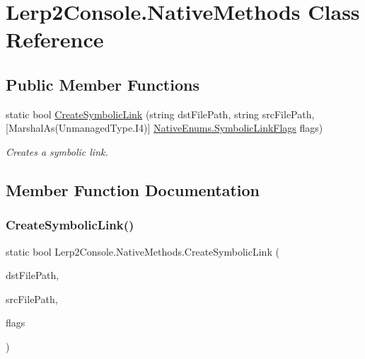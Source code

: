 \hypertarget{class_lerp2_console_1_1_native_methods}{}\section{Lerp2\+Console.\+Native\+Methods Class Reference}
\label{class_lerp2_console_1_1_native_methods}
\subsection*{Public Member Functions}
\begin{DoxyCompactItemize}
\item 
static bool \hyperlink{class_lerp2_console_1_1_native_methods_a66b966f8621e0c2a7237ccb8d6f463ca}{Create\+Symbolic\+Link} (string dst\+File\+Path, string src\+File\+Path, \mbox{[}Marshal\+As(Unmanaged\+Type.\+I4)\mbox{]} \hyperlink{class_lerp2_console_1_1_native_enums_a4eb3b3db1c6666b1e520bd67a14d9727}{Native\+Enums.\+Symbolic\+Link\+Flags} flags)
\begin{DoxyCompactList}\small\item\em Creates a symbolic link. \end{DoxyCompactList}\end{DoxyCompactItemize}


\subsection{Member Function Documentation}
\mbox{\label{class_lerp2_console_1_1_native_methods_a66b966f8621e0c2a7237ccb8d6f463ca}} 
\subsubsection{\texorpdfstring{Create\+Symbolic\+Link()}{CreateSymbolicLink()}}
{\footnotesize\ttfamily static bool Lerp2\+Console.\+Native\+Methods.\+Create\+Symbolic\+Link (\begin{DoxyParamCaption}\item[{string}]{dst\+File\+Path,  }\item[{string}]{src\+File\+Path,  }\item[{\mbox{[}\+Marshal\+As(\+Unmanaged\+Type.\+I4)\mbox{]} \hyperlink{class_lerp2_console_1_1_native_enums_a4eb3b3db1c6666b1e520bd67a14d9727}{Native\+Enums.\+Symbolic\+Link\+Flags}}]{flags }\end{DoxyParamCaption})}



